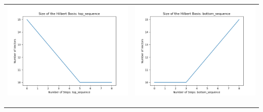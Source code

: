 \documentclass[10pt]{article}
\begin{document}
\begin{tabular}{c|c}
\begin{minipage}{.45\textwidth}
\includegraphics[width=\textwidth]{"DATA/4d/4 generators 2 bound B/top_sequence SIZE"}
\end{minipage} &
\begin{minipage}{.45\textwidth}
\includegraphics[width=\textwidth]{"DATA/4d/4 generators 2 bound B bottomup/bottom_sequence SIZE"}
\end{minipage} \\ \\
\hline \\\begin{minipage}{.45\textwidth}

\end{minipage}
\end{tabular}
\end{document}
